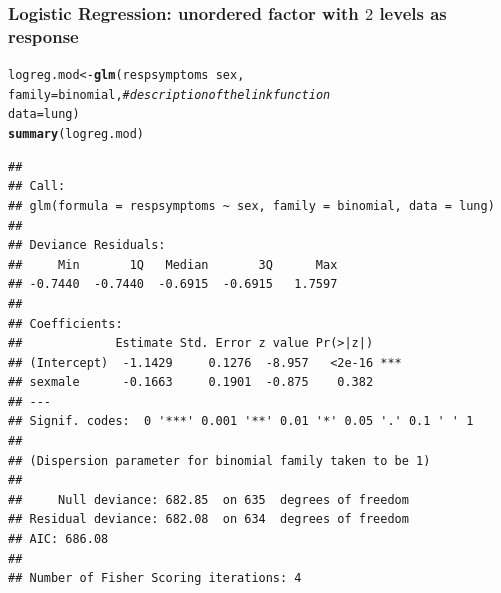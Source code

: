 \documentclass{beamer}\usepackage[]{graphicx}\usepackage[]{color}
\makeatletter
\newcommand{\hlcom}[1]{\textcolor[rgb]{0.678,0.584,0.686}{\textit{#1}}}%
\newcommand{\hlopt}[1]{\textcolor[rgb]{0,0,0}{#1}}%
\newcommand{\hlstd}[1]{\textcolor[rgb]{0.345,0.345,0.345}{#1}}%
\newcommand{\hlkwb}[1]{\textcolor[rgb]{0.69,0.353,0.396}{#1}}%
\newcommand{\hlkwc}[1]{\textcolor[rgb]{0.333,0.667,0.333}{#1}}%
\newcommand{\hlkwd}[1]{\textcolor[rgb]{0.737,0.353,0.396}{\textbf{#1}}}%
\newenvironment{kframe}{%
 \def\at@end@of@kframe{}%
 \ifinner\ifhmode%
  \def\at@end@of@kframe{\end{minipage}}%
  \begin{minipage}{\columnwidth}%
 \fi\fi%
 \def\FrameCommand##1{\hskip\@totalleftmargin \hskip-\fboxsep
 \colorbox{shadecolor}{##1}\hskip-\fboxsep
     \hskip-\linewidth \hskip-\@totalleftmargin \hskip\columnwidth}%
 \MakeFramed {\advance\hsize-\width
   \@totalleftmargin\z@ \linewidth\hsize
   \@setminipage}}%
 {\par\unskip\endMakeFramed%
 \at@end@of@kframe}
\newenvironment{knitrout}{}{} %
\makeatother
\begin{document}
{{{
\begin{frame}[fragile]
\frametitle{Logistic Regression: unordered factor with $2$ levels as response}
\begin{knitrout}\tiny
{}\color{fgcolor}\begin{kframe}
\begin{alltt}
\hlstd{logreg.mod} \hlkwb{<-} \hlkwd{glm}\hlstd{(respsymptoms} \hlopt{~} \hlstd{sex,}
               \hlkwc{family} \hlstd{= binomial,} \hlcom{# description of the link function}
               \hlkwc{data} \hlstd{= lung)}
\hlkwd{summary}\hlstd{(logreg.mod)}
\end{alltt}
\begin{verbatim}
## 
## Call:
## glm(formula = respsymptoms ~ sex, family = binomial, data = lung)
## 
## Deviance Residuals: 
##     Min       1Q   Median       3Q      Max  
## -0.7440  -0.7440  -0.6915  -0.6915   1.7597  
## 
## Coefficients:
##             Estimate Std. Error z value Pr(>|z|)    
## (Intercept)  -1.1429     0.1276  -8.957   <2e-16 ***
## sexmale      -0.1663     0.1901  -0.875    0.382    
## ---
## Signif. codes:  0 '***' 0.001 '**' 0.01 '*' 0.05 '.' 0.1 ' ' 1
## 
## (Dispersion parameter for binomial family taken to be 1)
## 
##     Null deviance: 682.85  on 635  degrees of freedom
## Residual deviance: 682.08  on 634  degrees of freedom
## AIC: 686.08
## 
## Number of Fisher Scoring iterations: 4
\end{verbatim}
\end{kframe}
\end{knitrout}
\end{frame}

}}}
\end{document}
